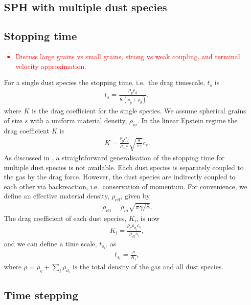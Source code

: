 \documentclass[fleqn,usenatbib]{mnras}
\begin{document}
\subsection{SPH with multiple dust species}

\subsection{Stopping time}

\textcolor{red}{
\begin{itemize}
   \item Discuss large grains vs small grains, strong vs weak coupling, and
      terminal velocity approximation.
\end{itemize}
}
For a single dust species the stopping time, i.e.\ the drag timescale, \(t_s\)
is
%
\begin{align}
   t_s = \frac{\rho_g \rho_d}{K (\rho_g + \rho_d)},
\end{align}
%
where \(K\) is the drag coefficient for the single species. We assume spherical
grains of size \(s\) with a uniform material density, \(\rho_m\). In the linear
Epstein regime \citep{Epstein1924PhRv...23..710E} the drag coefficient \(K\) is
%
\begin{align}
   K = \frac{\rho_g \rho_d}{\rho_m s} \sqrt{\frac{8}{\pi\gamma}} c_s.
\end{align}
%
As discussed in \citet{Hutchison2018MNRAS.476.2186H}, a straightforward
generalisation of the stopping time for multiple dust species is not available.
Each dust species is separately coupled to the gas by the drag force. However,
the dust species are indirectly coupled to each other via backreaction, i.e.\
conservation of momentum. For convenience, we define an effective material
density, \(\rho_{\mathrm{eff}}\), given by
%
\begin{align}
   \rho_{\mathrm{eff}} = \rho_m \sqrt{\pi\gamma/8}.
\end{align}
%
The drag coefficient of each dust species, \(K_i\), is now
%
\begin{align}
   K_i = \frac{\rho_g \rho_{d_i} c_s}{\rho_{\mathrm{eff}} s_i},
\end{align}
%
and we can define a time scale, \(t_{s_i}\), as
%
\begin{align}
   t_{s_i} = \frac{\rho}{K_i},
\end{align}
%
where \(\rho = \rho_g + \sum_i \rho_{d_i}\) is the total density of the gas and
all dust species.

\subsection{Time stepping}
\end{document}
